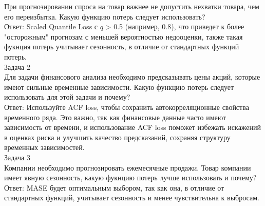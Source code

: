 При прогнозировании спроса на товар важнее не допустить нехватки товара, чем его переизбытка. Какую функцию потерь следует использовать?
\\
Ответ:
Scaled Quantile Loss с $q$ > 0.5 (например, 0.8), что приведет к более "осторожным" прогнозам с меньшей вероятностью недооценки, также такая фукнция потерь учитывает сезонность, в отличие от стандартных функций потерь.
\\
Задача 2\\
Для задачи финансового анализа необходимо предсказывать цены акций, которые имеют сильные временные зависимости. Какую функцию потерь следует использовать для этой задачи и почему?
\\
Ответ: Используйте ACF loss, чтобы сохранить автокорреляционные свойства временного ряда. Это важно, так как финансовые данные часто имеют зависимость от времени, и использование ACF loss поможет избежать искажений в оценках риска и улучшить качество предсказаний, сохраняя структуру временных зависимостей.
\\
Задача 3\\
Компании необходимо прогнозировать ежемесячные продажи. Товар компании имеет явную сезонность, какую фукнцию потерь лучше использовать и почему?
\\
Ответ: MASE будет оптимальным выбором, так как она, в отличие от стандартных функций, учитывает сезонность и менее чувствительна к выбросам.
